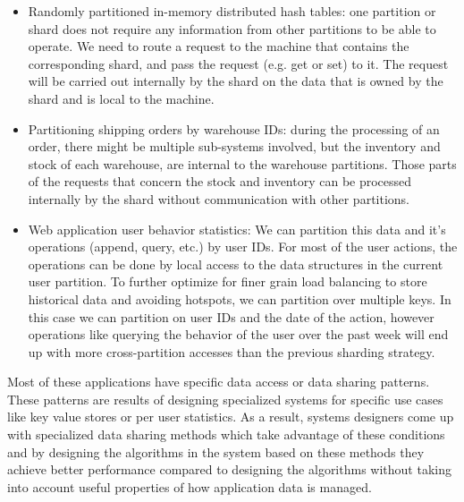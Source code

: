 \begin{itemize}
    \item Randomly partitioned in-memory distributed hash tables: one partition or shard
    does not require any information from other partitions to be able to
    operate. We need to route a request to the machine that contains the
    corresponding shard,
    and pass the request (e.g. get or set) to it. The
    request will be carried out internally by the shard on the data that
    is owned by the shard and is local to the machine.

    \item Partitioning shipping orders by warehouse IDs: during the
    processing of an order, there might be multiple sub-systems involved,
    but the inventory and stock of each warehouse, are internal to
    the warehouse partitions. Those parts of the requests that concern the
    stock and inventory can be processed internally by the shard without
    communication with other partitions.

    \item Web application user behavior statistics: We can partition this data
    and it's operations (append, query, etc.) by user IDs. For most of
    the user actions, the operations can be done by local access to the
    data structures in the current user partition. To further optimize for
    finer grain load balancing to store historical data and avoiding
    hotspots, we can partition over multiple keys. In this case we can
    partition on user IDs and the date of the action, however operations like
    querying the behavior of the user over the past
    week will end up with more cross-partition accesses than the previous
    sharding strategy.
\end{itemize}

Most of these applications have specific data access or data sharing patterns.
These patterns are results of designing specialized systems for specific
use cases like key value stores or per user statistics.
As a result, systems designers come up with specialized data sharing methods
which take advantage of these conditions and by designing the algorithms
in the system based on these methods they achieve better performance compared
to designing the algorithms without taking into account useful properties of
how application data is managed.

